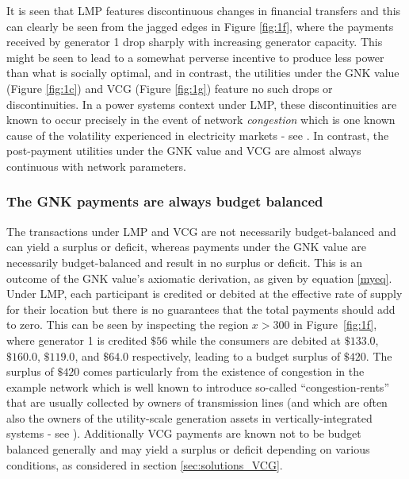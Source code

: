It is seen that LMP features discontinuous changes in financial transfers and this can clearly be seen from the jagged edges in Figure \ref{fig:1f}, where the payments received by generator 1 drop sharply with increasing generator capacity.
This might be seen to lead to a somewhat perverse incentive to produce less power than what is socially optimal, and in contrast, the utilities under the GNK value (Figure \ref{fig:1c}) and VCG  (Figure \ref{fig:1g}) feature no such drops or discontinuities.
In a power systems context under LMP, these discontinuities are known to occur precisely in the event of network \emph{congestion}
which is one known cause of the volatility experienced in electricity markets - see \cite{RePEc:aen:journl:2006v27-02-a09}. 
In contrast, the post-payment utilities under the GNK value and VCG are almost always continuous with network parameters.



\subsubsection*{The GNK payments are always budget balanced}
The transactions under LMP and VCG are not necessarily budget-balanced and can yield a surplus or deficit, whereas payments under the GNK value are necessarily budget-balanced and result in no surplus or deficit.
This is an outcome of the GNK value's axiomatic derivation, as given by equation \eqref{myeq}.
Under LMP, each participant is credited or debited at the effective rate of supply for their location but there is no guarantees that the total payments should add to zero.
This can be seen by inspecting the region $x>300$ in Figure~\ref{fig:1f}, where generator 1 is credited $\$56$ while the consumers are debited at $\$133.0$, $\$160.0$, $\$119.0$, and $\$64.0$ respectively, leading to a budget surplus of $\$420$.
The surplus of $\$420$ comes particularly from the existence of congestion in the example network which is well known to introduce so-called ``congestion-rents'' that are usually collected by owners of transmission lines (and which are often also the owners of the utility-scale generation assets in vertically-integrated systems - see \cite{lmp2}).
Additionally VCG payments are known not to be budget balanced generally and may yield a surplus or deficit depending on various conditions, as considered in section \ref{sec:solutions_VCG}.

